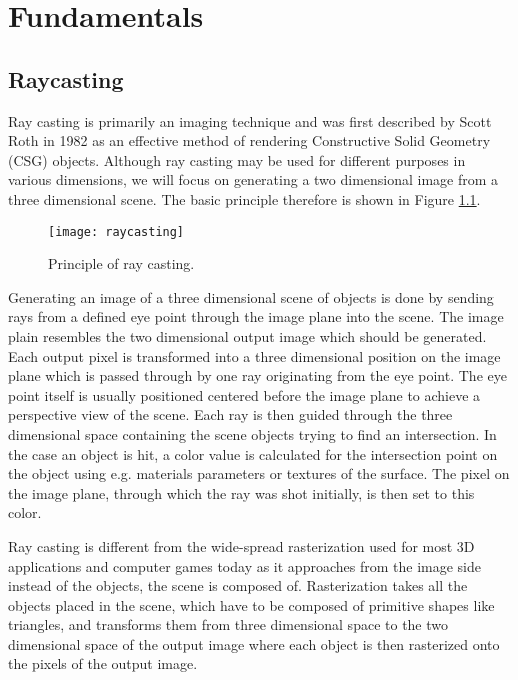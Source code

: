 \chapter{Fundamentals}
\label{sec:fundamentals}

\section{Raycasting}

Ray casting is primarily an imaging technique and was first described by Scott Roth in 1982 as an effective method of rendering Constructive Solid Geometry (CSG) objects. Although ray casting may be used for different purposes in various dimensions, we will focus on generating a two dimensional image from a three dimensional scene. The basic principle therefore is shown in Figure \ref{fig:raycasting}. 

\begin{figure}[h]
\centering
\texttt{[image: raycasting]}
\caption{Principle of ray casting.}
\label{fig:raycasting}
\end{figure}

Generating an image of a three dimensional scene of objects is done by sending rays from a defined eye point through the image plane into the scene. The image plain resembles the two dimensional output image which should be generated. Each output pixel is transformed into a three dimensional position on the image plane which is passed through by one ray originating from the eye point. The eye point itself is usually positioned centered before the image plane to achieve a perspective view of the scene. Each ray is then guided through the three dimensional space containing the scene objects trying to find an intersection. In the case an object is hit, a color value is calculated for the intersection point on the object using e.g. materials parameters or textures of the surface. The pixel on the image plane, through which the ray was shot initially, is then set to this color.

Ray casting is different from the wide-spread rasterization used for most 3D applications and computer games today as it approaches from the image side instead of the objects, the scene is composed of. Rasterization takes all the objects placed in the scene, which have to be composed of primitive shapes like triangles, and transforms them from three dimensional space to the two dimensional space of the output image where each object is then rasterized onto the pixels of the output image.

